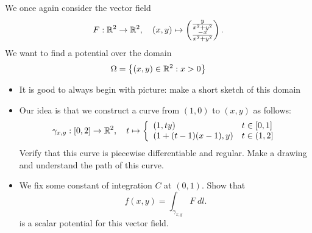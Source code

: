 \documentclass[11pt]{article}
\begin{document}
\begin{exercise}
	We once again consider the vector field 
	\[
		F : \mathbb{R}^2 \rightarrow \mathbb{R}^2, \quad (x,y) \mapsto \begin{pmatrix} \frac{y}{x^2+y^2} \\ \frac{-x}{x^2+y^2} \end{pmatrix}.
	\]
	We want to find a potential over the domain 
	\[
        \Omega = \left\{ (x,y) \in \mathbb{R}^2 : x > 0 \right\}
	\]
\end{exercise}
	\begin{itemize}
        \item 
        It is good to always begin with picture: make a short sketch of this domain
        \item 
        Our idea is that we construct a curve from $(1,0)$ to $(x,y)$ as follows:
        \begin{align}
            \gamma_{x,y} : [0,2] \rightarrow \mathbb{R}^2, \quad t \mapsto \left\{\begin{array}{ll}
                                                                \left( 1, ty \right) & t \in [0,1]
                                                                \\
                                                                \left( 1 + (t-1)(x-1),  y \right)  & t \in (1,2]
                                                               \end{array}\right.
        \end{align}
        Verify that this curve is piecewise differentiable and regular. 
        Make a drawing and understand the path of this curve.
        \item 
        We fix some constant of integration $C$ at $(0,1)$. Show that 
        \[
            f(x,y) = \int_{\gamma_{x,y}} F \;dl.
        \]
        is a scalar potential for this vector field.
	\end{itemize}
\begin{solution}
\end{solution}
\end{document}
